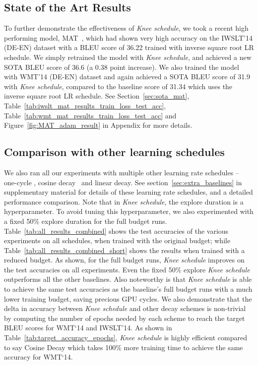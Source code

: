 \documentclass{article} \usepackage{iclr2021_conference,times}
\newcommand{\lrschedule}{\textit{Knee schedule}}
\begin{document}
\subsection{State of the Art Results}
To further demonstrate the effectiveness of \lrschedule{}, we took a recent high performing model, MAT~\citep{mat_fan2020}, which had shown very high accuracy on the IWSLT'14 (DE-EN) dataset with a BLEU score of 36.22 trained with inverse square root LR schedule. We simply retrained the model with \lrschedule{}, and achieved a new SOTA BLEU score of 36.6 (a 0.38 point increase). We also trained the model with WMT'14 (DE-EN) dataset and again achieved a SOTA BLEU score of 31.9 with \lrschedule{}, compared to the baseline score of 31.34 which uses the inverse square root LR schedule. See Section~\ref{sec:sota_mat}, Table~\ref{tab:iwslt_mat_results_train_loss_test_acc}, Table~\ref{tab:wmt_mat_results_train_loss_test_acc} and Figure~\ref{fig:MAT_adam_result} in Appendix for more details.

\subsection{Comparison with other learning schedules}

We also ran all our experiments with multiple other learning rate schedules -- one-cycle \citep{smith2018disciplined_onecycle}, cosine decay~\citep{loshchilov2016sgdr} and linear decay. See section~\ref{sec:extra_baselines} in supplementary material for details of these learning rate schedules, and a detailed performance comparison.
Note that in \lrschedule{}, the explore duration is a hyperparameter. To avoid tuning this hyperparameter, we also experimented with a fixed 50\% explore duration for the full budget runs.
Table~\ref{tab:all_results_combined} shows the test accuracies of the various experiments on all schedules, when trained with the original budget; while Table~\ref{tab:all_results_combined_short} shows the results when trained with a reduced budget. As shown, for the full budget runs, \lrschedule{} improves on the test accuracies on all experiments. Even the fixed 50\% explore \lrschedule{} outperforms all the other baselines. Also noteworthy is that \lrschedule{} is able to achieve the same test accuracies as the baseline's full budget runs with a much lower training budget, saving precious GPU cycles. 
We also demonstrate that the delta in accuracy between \lrschedule{} and other decay schemes is non-trivial by computing the number of epochs needed by each scheme to reach the target BLEU scores for WMT`14 and IWSLT'14. As shown in Table~\ref{tab:target_accuracy_epochs}, \lrschedule{} is highly efficient compared to say Cosine Decay which takes 100\% more training time to achieve the same accuracy for WMT`14.
\end{document}
